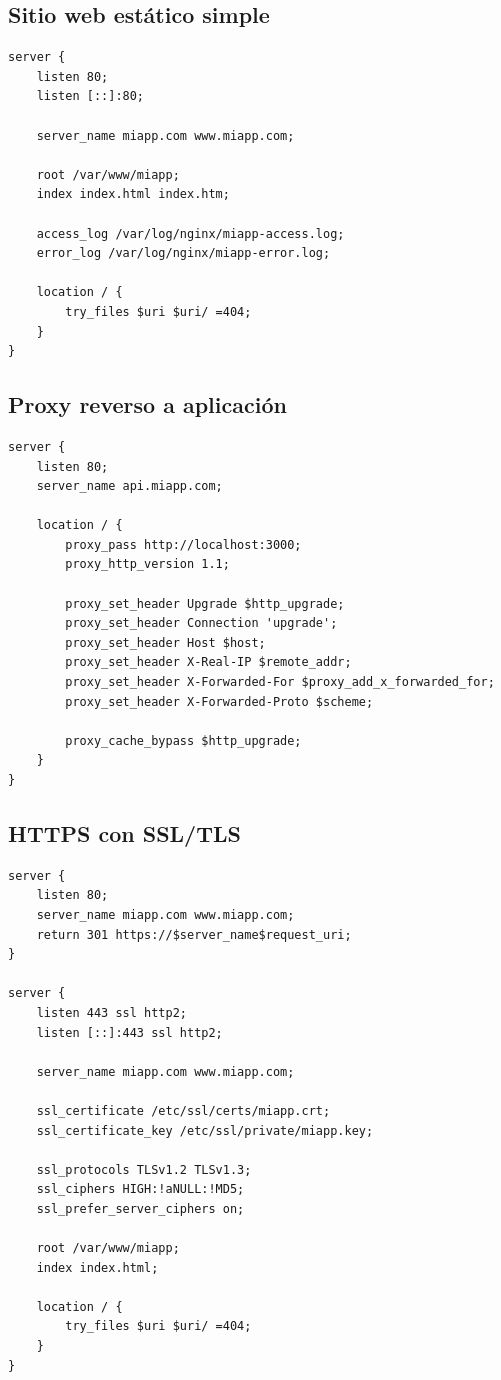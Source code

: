 \documentclass[11pt,a4paper]{article}
\begin{document}
\subsection{Sitio web estático simple}

\begin{lstlisting}[caption=sites-available/miapp.com.conf]
server {
    listen 80;
    listen [::]:80;
    
    server_name miapp.com www.miapp.com;
    
    root /var/www/miapp;
    index index.html index.htm;
    
    access_log /var/log/nginx/miapp-access.log;
    error_log /var/log/nginx/miapp-error.log;
    
    location / {
        try_files $uri $uri/ =404;
    }
}
\end{lstlisting}

\subsection{Proxy reverso a aplicación}

\begin{lstlisting}[caption=Proxy a Node.js/Python/etc]
server {
    listen 80;
    server_name api.miapp.com;
    
    location / {
        proxy_pass http://localhost:3000;
        proxy_http_version 1.1;
        
        proxy_set_header Upgrade $http_upgrade;
        proxy_set_header Connection 'upgrade';
        proxy_set_header Host $host;
        proxy_set_header X-Real-IP $remote_addr;
        proxy_set_header X-Forwarded-For $proxy_add_x_forwarded_for;
        proxy_set_header X-Forwarded-Proto $scheme;
        
        proxy_cache_bypass $http_upgrade;
    }
}
\end{lstlisting}

\subsection{HTTPS con SSL/TLS}

\begin{lstlisting}[caption=Configuración SSL completa]
server {
    listen 80;
    server_name miapp.com www.miapp.com;
    return 301 https://$server_name$request_uri;
}

server {
    listen 443 ssl http2;
    listen [::]:443 ssl http2;
    
    server_name miapp.com www.miapp.com;
    
    ssl_certificate /etc/ssl/certs/miapp.crt;
    ssl_certificate_key /etc/ssl/private/miapp.key;
    
    ssl_protocols TLSv1.2 TLSv1.3;
    ssl_ciphers HIGH:!aNULL:!MD5;
    ssl_prefer_server_ciphers on;
    
    root /var/www/miapp;
    index index.html;
    
    location / {
        try_files $uri $uri/ =404;
    }
}
\end{lstlisting}
\end{document}
